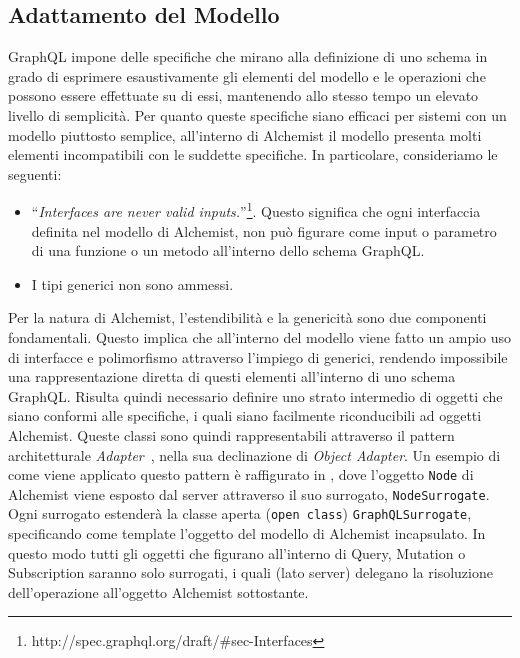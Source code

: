 \subsection{Adattamento del Modello}\label{ssec:model-adaptation}
GraphQL impone delle specifiche che mirano alla definizione di uno schema in grado di esprimere
esaustivamente gli elementi del modello e le operazioni che possono essere effettuate su di essi, mantenendo allo stesso tempo un elevato livello di semplicità.
Per quanto queste specifiche siano efficaci per sistemi con un modello piuttosto semplice, all'interno di Alchemist il modello presenta molti elementi incompatibili
con le suddette specifiche. In particolare, consideriamo le seguenti:
\begin{itemize}
    \item ``\textit{Interfaces are never valid inputs.}''\footnote{http://spec.graphql.org/draft/\#sec-Interfaces}. Questo significa che ogni interfaccia
        definita nel modello di Alchemist, non può figurare come input o parametro di una funzione o un metodo all'interno dello schema GraphQL.
    \item I tipi generici non sono ammessi.
\end{itemize}
Per la natura di Alchemist, l'estendibilità e la genericità sono due componenti fondamentali. Questo implica che all'interno del modello viene fatto un
ampio uso di interfacce e polimorfismo attraverso l'impiego di generici, rendendo impossibile una rappresentazione diretta di questi elementi all'interno
di uno schema GraphQL.
Risulta quindi necessario definire uno strato intermedio di oggetti che siano conformi alle specifiche, i quali siano facilmente riconducibili ad oggetti
Alchemist. Queste classi sono quindi rappresentabili attraverso il pattern architetturale \textit{Adapter}~\cite{design-patterns}, nella sua declinazione
di \textit{Object Adapter}. Un esempio di come viene applicato questo pattern è raffigurato in , dove l'oggetto \texttt{Node} di Alchemist
viene esposto dal server attraverso il suo surrogato, \texttt{NodeSurrogate}.
%
%
Ogni surrogato estenderà la classe aperta (\texttt{open class}) \texttt{GraphQLSurrogate}, specificando come template l'oggetto del modello di Alchemist
incapsulato.
%
In questo modo tutti gli oggetti che figurano all'interno di Query, Mutation o Subscription saranno solo surrogati, i quali (lato server) delegano la
risoluzione dell'operazione all'oggetto Alchemist sottostante.
\newpage
%
